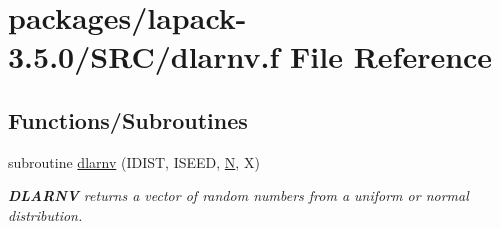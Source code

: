 \hypertarget{dlarnv_8f}{}\section{packages/lapack-\/3.5.0/\+S\+R\+C/dlarnv.f File Reference}
\label{dlarnv_8f}
\subsection*{Functions/\+Subroutines}
\begin{DoxyCompactItemize}
\item 
subroutine \hyperlink{group__auxOTHERauxiliary_ga77e05a87ced667cbdb502aa87c72d056}{dlarnv} (I\+D\+I\+S\+T, I\+S\+E\+E\+D, \hyperlink{polmisc_8c_a0240ac851181b84ac374872dc5434ee4}{N}, X)
\begin{DoxyCompactList}\small\item\em {\bfseries D\+L\+A\+R\+N\+V} returns a vector of random numbers from a uniform or normal distribution. \end{DoxyCompactList}\end{DoxyCompactItemize}
